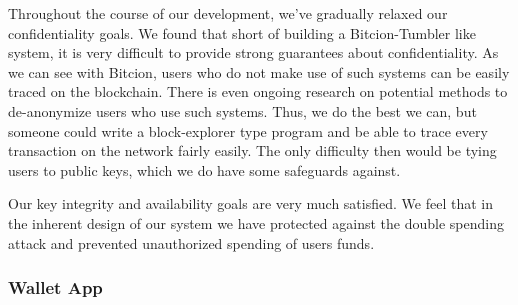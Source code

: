 \documentclass[12pt]{article}
\begin{document}
Throughout the course of our development, we've gradually relaxed our confidentiality goals. We found that short of building a Bitcion-Tumbler like system, it is very difficult to provide strong guarantees about confidentiality. As we can see with Bitcion, users who do not make use of such systems can be easily traced on the blockchain. There is even ongoing research on potential methods to de-anonymize users who use such systems. Thus, we do the best we can, but someone could write a block-explorer type program and be able to trace every transaction on the network fairly easily. The only difficulty then would be tying users to public keys, which we do have some safeguards against.

Our key integrity and availability goals are very much satisfied. We feel that in the inherent design of our system we have protected against the double spending attack and prevented unauthorized spending of users funds.

\subsubsection*{Wallet App}

\end{document}
